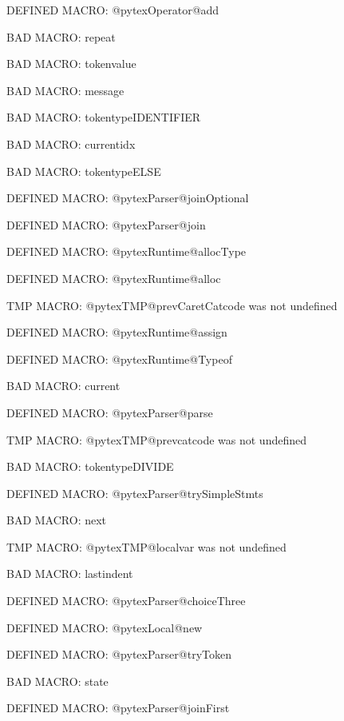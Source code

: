 \ifx\@pytexOperator@add\undefined\else DEFINED MACRO: @pytexOperator@add
\fi

BAD MACRO: repeat

BAD MACRO: tokenvalue

BAD MACRO: message

BAD MACRO: tokentypeIDENTIFIER

BAD MACRO: currentidx

BAD MACRO: tokentypeELSE

\ifx\@pytexParser@joinOptional\undefined\else DEFINED MACRO: @pytexParser@joinOptional
\fi

\ifx\@pytexParser@join\undefined\else DEFINED MACRO: @pytexParser@join
\fi

\ifx\@pytexRuntime@allocType\undefined\else DEFINED MACRO: @pytexRuntime@allocType
\fi

\ifx\@pytexRuntime@alloc\undefined\else DEFINED MACRO: @pytexRuntime@alloc
\fi

\ifx\@pytexTMP@prevCaretCatcode\undefined\else TMP MACRO: @pytexTMP@prevCaretCatcode was not undefined
\fi

\ifx\@pytexRuntime@assign\undefined\else DEFINED MACRO: @pytexRuntime@assign
\fi

\ifx\@pytexRuntime@Typeof\undefined\else DEFINED MACRO: @pytexRuntime@Typeof
\fi

BAD MACRO: current

\ifx\@pytexParser@parse\undefined\else DEFINED MACRO: @pytexParser@parse
\fi

\ifx\@pytexTMP@prevcatcode\undefined\else TMP MACRO: @pytexTMP@prevcatcode was not undefined
\fi

BAD MACRO: tokentypeDIVIDE

\ifx\@pytexParser@trySimpleStmts\undefined\else DEFINED MACRO: @pytexParser@trySimpleStmts
\fi

BAD MACRO: next

\ifx\@pytexTMP@localvar\undefined\else TMP MACRO: @pytexTMP@localvar was not undefined
\fi

BAD MACRO: lastindent

\ifx\@pytexParser@choiceThree\undefined\else DEFINED MACRO: @pytexParser@choiceThree
\fi

\ifx\@pytexLocal@new\undefined\else DEFINED MACRO: @pytexLocal@new
\fi

\ifx\@pytexParser@tryToken\undefined\else DEFINED MACRO: @pytexParser@tryToken
\fi

BAD MACRO: state

\ifx\@pytexParser@joinFirst\undefined\else DEFINED MACRO: @pytexParser@joinFirst
\fi

